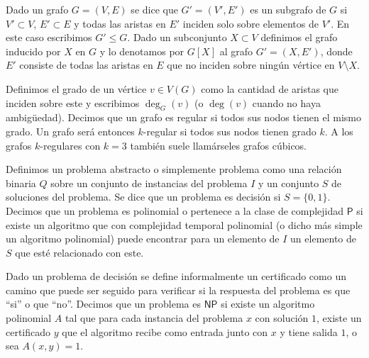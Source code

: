 \documentclass[10pt]{amsart}
\theoremstyle{definition}
\numberwithin{equation}{section}
\newcommand{\edge}[1]{\langle #1\rangle}
\begin{document}

Dado un grafo $G = (V,E)$ se dice que $G' = (V', E')$ es un subgrafo  de $G$ si $V' \subset V$, $E' \subset E$ y todas las aristas en $E'$ inciden solo sobre elementos de $V'$.  En este caso escribimos $G' \le G$. Dado un subconjunto $X \subset V$ definimos el grafo inducido por $X$ en $G$ y lo denotamos por $G[X]$ al grafo $G' = (X, E')$, donde $E'$ consiste de todas las aristas en $E$ que no inciden sobre ning\'un v\'ertice en $V \setminus X$.
 
Definimos el grado de un v\'ertice $v \in V(G)$ como la cantidad de aristas que inciden sobre este y escribimos $\deg_G(v)$ (o $\deg(v)$ cuando no haya ambigüedad). Decimos que un grafo es regular si todos sus nodos tienen el mismo grado. Un grafo ser\'a entonces $k$-regular si todos sus nodos tienen grado $k$. A los grafos $k$-regulares con $k = 3$ tambi\'en suele llam\'arseles grafos c\'ubicos.


Definimos un problema abstracto o simplemente problema como una relaci\'on binaria $Q$ sobre un conjunto de instancias del problema $I$ y un conjunto $S$ de soluciones del problema. Se dice que un problema es decisi\'on si $S = \{0, 1\}$.  Decimos que un problema es polinomial o pertenece a la clase de complejidad $\mathsf{P}$ si existe un algoritmo que con complejidad temporal polinomial (o dicho m\'as simple un algoritmo polinomial) puede encontrar para un elemento de $I$ un elemento de $S$ que est\'e relacionado con este. 

Dado un problema de decisi\'on se define informalmente un certificado  como un camino que puede ser seguido para verificar si la respuesta del problema es que ``si'' o que ``no''. Decimos que un problema es $\mathsf{NP}$ si existe un algoritmo polinomial $A$ tal que para cada instancia del problema $x$ con soluci\'on $1$, existe un certificado $y$ que el algoritmo recibe como entrada junto con $x$ y tiene salida $1$, o sea $A(x,y) = 1$.
\end{document}
